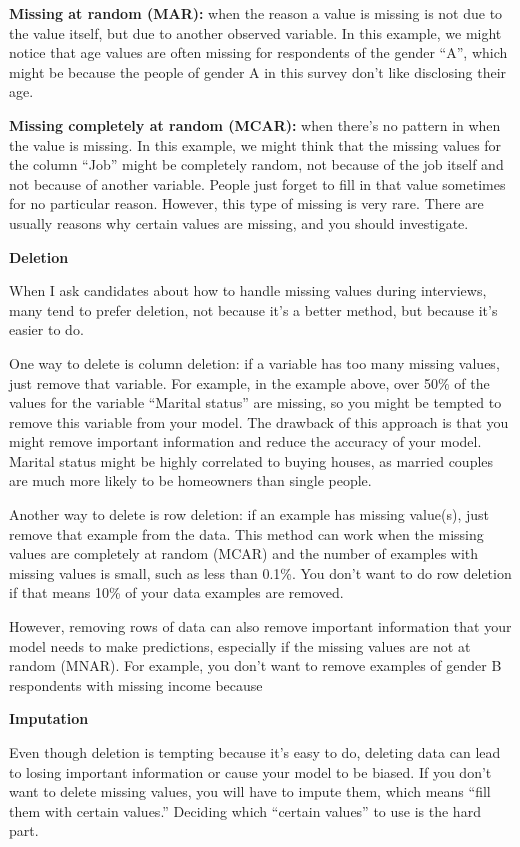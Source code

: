 \documentclass[openany]{book}
\begin{document}
\textbf{Missing at random (MAR):} when the reason a value is missing is not due to the value itself, but due to another observed variable. In this example, we might notice that age values are often missing for respondents of the gender “A”, which might be because the people of gender A in this survey don’t like disclosing their age.

\textbf{Missing completely at random (MCAR): }when there’s no pattern in when the value is missing. In this example, we might think that the missing values for the column “Job” might be completely random, not because of the job itself and not because of another variable. People just forget to fill in that value sometimes for no particular reason. However, this type of missing is very rare. There are usually reasons why certain values are missing, and you should investigate.


\textbf{Deletion}

When I ask candidates about how to handle missing values during interviews, many tend to prefer deletion, not because it’s a better method, but because it’s easier to do.

One way to delete is column deletion: if a variable has too many missing values, just remove that variable. For example, in the example above, over 50\% of the values for the variable “Marital status” are missing, so you might be tempted to remove this variable from your model. The drawback of this approach is that you might remove important information and reduce the accuracy of your model. Marital status might be highly correlated to buying houses, as married couples are much more likely to be homeowners than single people.

Another way to delete is row deletion: if an example has missing value(s), just remove that example from the data. This method can work when the missing values are completely at random (MCAR) and the number of examples with missing values is small, such as less than 0.1\%. You don’t want to do row deletion if that means 10\% of your data examples are removed.

However, removing rows of data can also remove important information that your model needs to make predictions, especially if the missing values are not at random (MNAR). For example,  you don’t want to remove examples of gender B respondents with missing income because 

\textbf{Imputation}

Even though deletion is tempting because it’s easy to do, deleting data can lead to losing important information or cause your model to be biased. If you don’t want to delete missing values, you will have to impute them, which means “fill them with certain values.” Deciding which “certain values” to use is the hard part.
\end{document}
